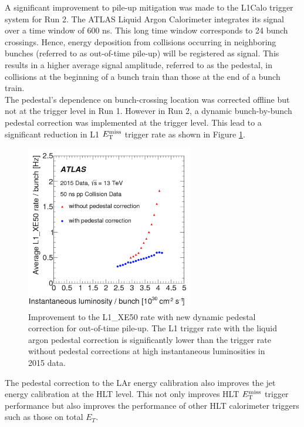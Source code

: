 \indent A significant improvement to pile-up mitigation was made to the L1Calo trigger system for Run 2.\cite{Trigger2015}  The ATLAS Liquid Argon Calorimeter integrates its signal over a time window of $600$ ns.  This long time window corresponds to 24 bunch crossings.  Hence, energy deposition from collisions occurring in neighboring bunches (referred to as out-of-time pile-up) will be registered as signal.  This results in a higher average signal amplitude, referred to as the pedestal, in collisions at the beginning of a bunch train than those at the end of a bunch train.  \\

\indent The pedestal's dependence on bunch-crossing location was corrected offline but not at the trigger level in Run 1.  However in Run 2, a dynamic bunch-by-bunch pedestal correction was implemented at the trigger level.  This lead to a significant reduction in L1 $E_{\mathrm{T}}^{\mathrm{miss}}$ trigger rate as shown in Figure \ref{fig:L1METImprove}. \\

\begin{figure}[h!]
  \begin{center}
    \includegraphics[width=0.65\textwidth]{figures/trigger/L1_XE50.png}\hspace{0.05\textwidth}
\end{center}
\caption[Improvement to the {\sc L1\_XE50} rate with new dynamic pedestal correction for out-of-time pile-up]{Improvement to the {\sc L1\_XE50} rate with new dynamic pedestal correction for out-of-time pile-up.\cite{Trigger2015}  The L1 trigger rate with the liquid argon pedestal correction is significantly lower than the trigger rate without pedestal corrections at high instantaneous luminosities in 2015 data.  }
\label{fig:L1METImprove} 
\end{figure}

\indent The pedestal correction to the LAr energy calibration also improves the jet energy calibration at the HLT level.  This not only improves HLT $E_{\mathrm{T}}^{\mathrm{miss}}$ trigger performance but also improves the performance of other HLT calorimeter triggers such as those on total $E_T$. \cite{Trigger2016} \\